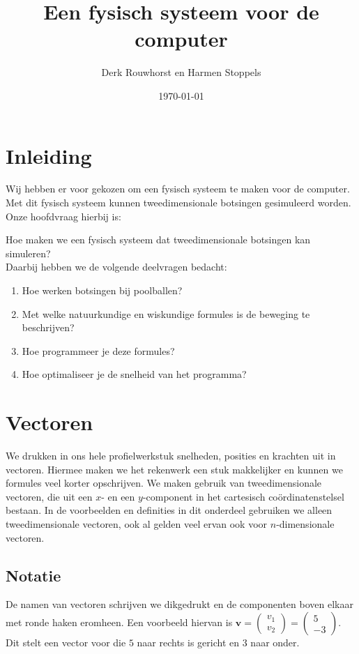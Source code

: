 \documentclass[12pt,a4paper]{article}
\title{Een fysisch systeem voor de computer}
\date{\today}
\author{Derk Rouwhorst en Harmen Stoppels}
\begin{document}
	\begin{titlepage}
		\maketitle
		\thispagestyle{empty}
	\end{titlepage}

	\tableofcontents
	\newpage

	\section{Inleiding}
	Wij hebben er voor gekozen om een fysisch systeem te maken voor de computer. Met dit fysisch systeem kunnen tweedimensionale botsingen gesimuleerd worden. Onze hoofdvraag hierbij is:

	Hoe maken we een fysisch systeem dat tweedimensionale botsingen kan simuleren?
	\\Daarbij hebben we de volgende deelvragen bedacht:

	\begin{enumerate}
		\item Hoe werken botsingen bij poolballen?
		\item Met welke natuurkundige en wiskundige formules is de beweging te beschrijven?
		\item Hoe programmeer je deze formules?
		\item Hoe optimaliseer je de snelheid van het programma?
	\end{enumerate}
	
	\newpage
	
	\section{Vectoren}
	We drukken in ons hele profielwerkstuk snelheden, posities en krachten uit in vectoren. Hiermee maken we het rekenwerk een stuk makkelijker en kunnen we formules veel korter opschrijven. We maken gebruik van tweedimensionale vectoren, die uit een $x$- en een $y$-component in het cartesisch co\"{o}rdinatenstelsel bestaan. In de voorbeelden en definities in dit onderdeel gebruiken we alleen tweedimensionale vectoren, ook al gelden veel ervan ook voor $n$-dimensionale vectoren.
	
	\subsection{Notatie}
	De namen van vectoren schrijven we dikgedrukt en de componenten boven elkaar met ronde haken eromheen. Een voorbeeld hiervan is $\mathbf{v} = \begin{pmatrix} v_1 \\ v_2 \end{pmatrix} = \begin{pmatrix} 5 \\ -3 \end{pmatrix}$. Dit stelt een vector voor die $5$ naar rechts is gericht en $3$ naar onder.
	
\end{document}
